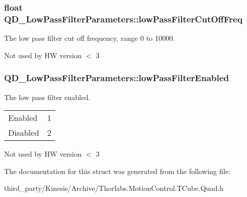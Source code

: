 \subsubsection[{\texorpdfstring{low\+Pass\+Filter\+Cut\+Off\+Freq}{lowPassFilterCutOffFreq}}]{\setlength{\rightskip}{0pt plus 5cm}float Q\+D\+\_\+\+Low\+Pass\+Filter\+Parameters\+::low\+Pass\+Filter\+Cut\+Off\+Freq}\hypertarget{struct_q_d___low_pass_filter_parameters_a86ece89720e25653389a4a6b11a5a025}{}\label{struct_q_d___low_pass_filter_parameters_a86ece89720e25653389a4a6b11a5a025}


The low pass filter cut off frequency, range 0 to 10000. 

Not used by HW version $<$ 3
\subsubsection[{\texorpdfstring{low\+Pass\+Filter\+Enabled}{lowPassFilterEnabled}}]{ Q\+D\+\_\+\+Low\+Pass\+Filter\+Parameters\+::low\+Pass\+Filter\+Enabled}\hypertarget{struct_q_d___low_pass_filter_parameters_a73065ea4d9e24f94d5a9802da69f06fe}{}\label{struct_q_d___low_pass_filter_parameters_a73065ea4d9e24f94d5a9802da69f06fe}


The low pass filter enabled. \tabulinesep=1mm
\begin{longtabu} spread 0pt [c]{*2{|X[-1]}|}
\hline
Enabled&1 \\
Disabled&2 \\
\end{longtabu}


Not used by HW version $<$ 3

The documentation for this struct was generated from the following file\+:\begin{DoxyCompactItemize}
\item 
third\+\_\+party/\+Kinesis/\+Archive/Thorlabs.\+Motion\+Control.\+T\+Cube.\+Quad.\+h\end{DoxyCompactItemize}
